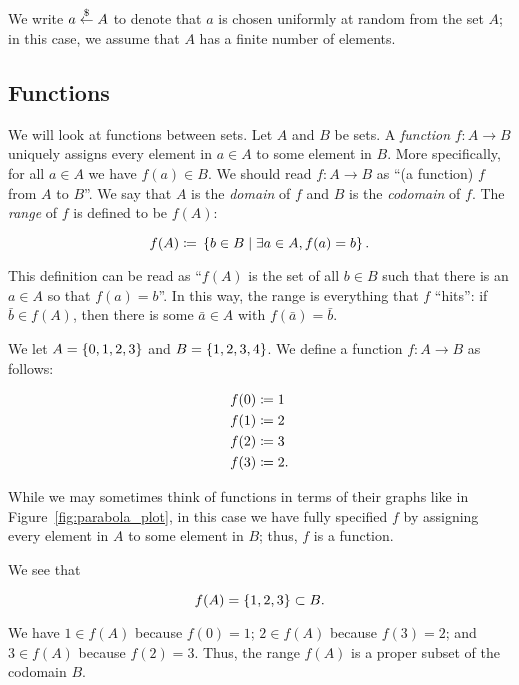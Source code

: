 We write $a\stackrel{\$}{\leftarrow}{}A$ to denote that $a$ is chosen uniformly
at random from the \gls{set} $A$;
in this case, we assume that $A$ has a finite number of elements.

\subsection{Functions}

We will look at \glspl{function} between \glspl{set}.
Let $A$ and $B$ be \glspl{set}.
A \emph{\gls{function}} $f:A\to B$ uniquely assigns every element in
$a\in A$ to some element in $B$.
More specifically, for all $a\in A$ we have $f(a)\in B$.
We should read $f:A\to B$ as ``(a function) $f$ from $A$ to $B$''.
We say that $A$ is the \emph{domain} of $f$
and $B$ is the \emph{codomain} of $f$.
The \emph{range} of $f$ is defined to be $f(A)$:

\begin{equation}
    f(A) \coloneqq{} \left\{ b\in B \mid \exists a\in A, f(a) = b \right\}.
\end{equation}

\noindent
This definition can be read as ``$f(A)$ is the set of all $b\in B$
such that there is an $a\in A$ so that $f(a) = b$''.
In this way, the range is everything that $f$ ``hits'':
if $\bar{b}\in f(A)$, then there is some $\bar{a}\in A$ with
$f(\bar{a}) = \bar{b}$.

\begin{example}
\label{example:function}
We let $A = \left\{ 0, 1, 2, 3 \right\}$ and $B = \left\{ 1, 2, 3, 4 \right\}$.
We define a \gls{function} $f:A\to B$ as follows:

\begin{align}
    f(0) &\coloneqq{} 1 \nonumber\\
    f(1) &\coloneqq{} 2 \nonumber\\
    f(2) &\coloneqq{} 3 \nonumber\\
    f(3) &\coloneqq{} 2.
\end{align}

\noindent
While we may sometimes think of \glspl{function} in terms of their graphs
like in Figure~\ref{fig:parabola_plot},
in this case we have fully specified $f$ by assigning every element in $A$
to some element in $B$;
thus, $f$ is a \gls{function}.

We see that

\begin{equation}
    f(A) = \left\{ 1,2,3 \right\} \subset B.
\end{equation}

\noindent
We have $1\in f(A)$ because $f(0) = 1$;
$2\in f(A)$ because $f(3) = 2$; and
$3\in f(A)$ because $f(2) = 3$.
Thus, the range $f(A)$ is a proper subset of the codomain $B$.
\end{example}

